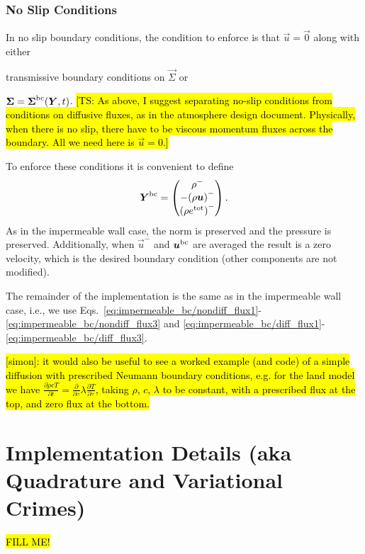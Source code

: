 \documentclass{report}
\begin{document}
\subsubsection{No Slip Conditions}
In no slip boundary conditions, the condition to enforce is that $\vec{u} =
\vec{0}$ along with either
\begin{enumerate*}[label = (\roman*)]
  \item transmissive boundary conditions on $\vec{\Sigma}$ or
  \item $\vec{\Sigma} = \vec{\Sigma}^{\rm bc}(\vec{Y}, t)$. \hl{[TS: As above, I suggest separating no-slip conditions from conditions on diffusive fluxes, as in the atmosphere design document. Physically, when there is no slip, there have to be viscous momentum fluxes across the boundary. All we need here is $\vec{u} = 0$.]}
\end{enumerate*}
To enforce these conditions it is convenient to define
\begin{align}
  \vec{Y}^{\rm bc}
  =
  \begin{pmatrix}
    \rho^{-}\\
    -{\left(\rho \vec{u}\right)}^{-}\\
    {\left(\rho e^{\rm tot}\right)}^{-}
  \end{pmatrix}.
\end{align}
As in the impermeable wall case, the norm is preserved and the pressure is
preserved.  Additionally, when $\vec{u}^{-}$ and
$\vec{u}^{\rm bc}$ are averaged the result is a zero velocity,
which is the desired boundary condition (other components are not modified).

The remainder of the implementation is the same as in the impermeable wall case, i.e., we use Eqs.\ \eqref{eq:impermeable_bc/nondiff_flux1}-\eqref{eq:impermeable_bc/nondiff_flux3} and \eqref{eq:impermeable_bc/diff_flux1}-\eqref{eq:impermeable_bc/diff_flux3}.

\hl{[simon]: it would also be useful to see a worked example (and code) of a simple diffusion with prescribed Neumann boundary conditions, e.g. for the land model we have $\frac{\partial{\rho c T}}{\partial t} = \frac{\partial}{\partial z} \lambda \frac{\partial T}{\partial z}$, taking $\rho$, $c$, $\lambda$ to be constant, with a prescribed flux at the top, and zero flux at the bottom.}

\section{Implementation Details (aka Quadrature and Variational Crimes)}
\hl{FILL ME\@!}
\end{document}
